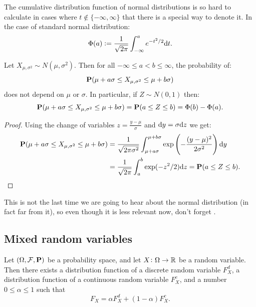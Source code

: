 \documentclass[11pt,a4paper]{article}
\begin{document}
\begin{remark}
  The cumulative distribution function of normal distributions is so
  hard to calculate in cases where $t \notin \{-\infty,\infty\}$ that
  there is a special way to denote it.
  In the case of standard normal distribution:
  \[
    \Phi(a) :=
    \frac{1}{\sqrt{2 \pi}}
    \int_{-\infty}^{a} e^{-t^{2}/2} \mathrm{d} t.
  \]
\end{remark}

\begin{theorem}
  \label{thm:normal-computation}
  Let $X_{\mu,\sigma^2} \sim N(\mu,\sigma^2)$.
  Then for all $-\infty \le a < b \le \infty$,
  the probability of:
  \[
    \mathbf{P}(\mu + a \sigma \le X_{\mu,\sigma^2} \le \mu + b \sigma)
  \]
  does not depend on $\mu$ or $\sigma$.
  In particular, if $Z \sim N(0,1)$ then:
  \[
    \mathbf{P}(\mu + a \sigma \le X_{\mu,\sigma^2} \le \mu + b \sigma) =
    \mathbf{P}(a \le Z \le b) = \Phi(b) - \Phi(a).
  \]
\end{theorem}
\begin{proof}
  Using the change of variables $z = \frac{y - \mu}{\sigma}$
  and $\dy = \sigma \dz$ we get:
  \begin{align*}
    \Prob(\mu + a \sigma \le X_{\mu,\sigma^2} \le \mu + b \sigma) &=
    \frac{1}{\sqrt{2\pi\sigma^{2}}}
    \int_{\mu + a \sigma}^{\mu + b \sigma}
    \exp\left(-\frac{(y-\mu)^{2}}{2\sigma^{2}}\right) \dy \\ &=
    \frac{1}{\sqrt{2\pi}}
    \int_{a}^{b} \exp(-z^2/2) \dz =
    \Prob(a \le Z \le b).
  \end{align*}
\end{proof}

\begin{remark}
  This is not the last time we are going to hear about
  the normal distribution (in fact far from it),
  so even though it is less relevant now,
  don't forget .
\end{remark}

\subsection{Mixed random variables}
\begin{theorem}
  \label{thm:mixed-rv}
  Let $(\Omega, \mathcal F, \mathbf{P})$ be a probability space,
  and let $X \colon \Omega \to \mathbb{R}$ be a random variable.
  Then there exists a distribution function of a discrete random variable
  $F_X^d$, a distribution function of a continuous random variable
  $F_X^c$, and a number $0 \le \alpha \le 1$ such that
  \[
    F_X = \alpha F_X^d + (1 - \alpha)F_X^c.
  \]
\end{theorem}
\end{document}
